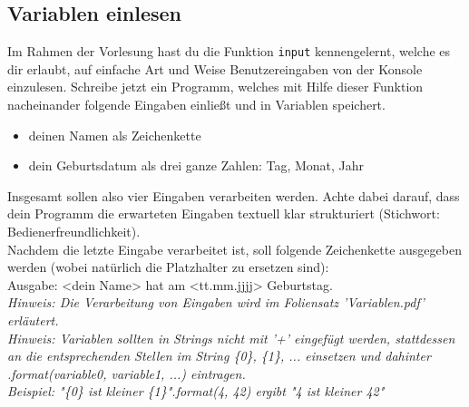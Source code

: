 \subsection{Variablen einlesen}
Im Rahmen der Vorlesung hast du die Funktion \texttt{input} kennengelernt, welche es dir erlaubt, auf einfache Art und Weise Benutzereingaben von der Konsole einzulesen. Schreibe jetzt ein Programm, welches mit Hilfe dieser Funktion nacheinander folgende Eingaben einließt und in Variablen speichert. 
\begin{itemize}
	\item deinen Namen als Zeichenkette
	\item dein Geburtsdatum als drei ganze Zahlen: Tag, Monat, Jahr
\end {itemize}
Insgesamt sollen also vier Eingaben verarbeiten werden. Achte dabei darauf, dass dein Programm die erwarteten Eingaben textuell klar strukturiert (Stichwort: Bedienerfreundlichkeit).\\Nachdem die letzte Eingabe verarbeitet ist, soll folgende Zeichenkette ausgegeben werden (wobei natürlich die Platzhalter zu ersetzen sind):\\Ausgabe: {\ttfamily{\dq}}<dein Name> hat am <tt.mm.jjjj> Geburtstag.{\ttfamily{\dq}}
\\\textit{Hinweis: Die Verarbeitung von Eingaben wird im Foliensatz 'Variablen.pdf' erläutert.}
\\\textit{Hinweis: Variablen sollten in Strings nicht mit '+' eingefügt werden, stattdessen an die entsprechenden Stellen im String \{0\}, \{1\}, ... einsetzen und dahinter .format(variable0, variable1, ...) eintragen. \\
Beispiel: "\{0\} ist kleiner \{1\}".format(4, 42) ergibt "4 ist kleiner 42"}
